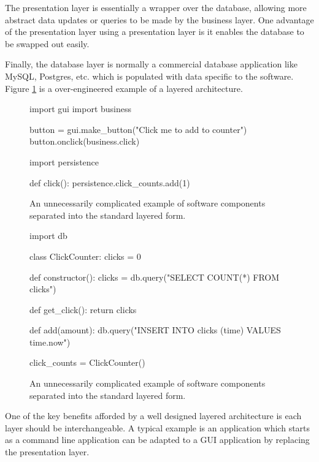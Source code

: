The presentation layer is essentially a wrapper over the database, allowing more abstract data updates or queries to be made by the business layer.
One advantage of the presentation layer using a presentation layer is it enables the database to be swapped out easily.

Finally, the database layer is normally a commercial database application like MySQL, Postgres, etc. which is populated with data specific to the software.
Figure \ref{fig:standard-form-example} is a over-engineered example of a layered architecture.

\begin{figure}[H]
\begin{code}[style=python,title=presentation.code,captionpos=t]
import gui
import business

button = gui.make_button("Click me to add to counter")
button.onclick(business.click)
\end{code}

\begin{code}[style=python,title=business.code,captionpos=t]
import persistence

def click():
    persistence.click_counts.add(1)
\end{code}
\caption{An unnecessarily complicated example of software components separated into the standard layered form.}
\label{fig:standard-form-example}
\end{figure}

\begin{figure}[H]
\ContinuedFloat
\begin{code}[style=python,title=persistence.code,captionpos=t]
import db

class ClickCounter:
    clicks = 0

    def constructor():
        clicks = db.query("SELECT COUNT(*) FROM clicks")

    def get_click():
        return clicks

    def add(amount):
        db.query("INSERT INTO clicks (time) VALUES {{time.now}}")

click_counts = ClickCounter()
\end{code}
\caption{An unnecessarily complicated example of software components separated into the standard layered form.}
\end{figure}

One of the key benefits afforded by a well designed layered architecture is each layer should be interchangeable.
A typical example is an application which starts as a command line application can be adapted to a GUI application by replacing the presentation layer.


